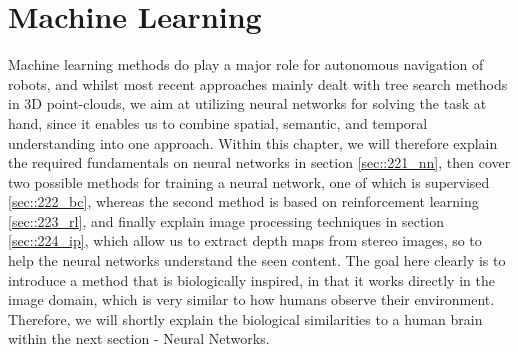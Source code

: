 \FloatBarrier
\section{Machine Learning}  
\label{sec::22_ml}
Machine learning methods do play a major role for autonomous navigation of robots, and whilst most recent approaches mainly dealt with tree search methods in 3D point-clouds, we aim at utilizing neural networks for solving the task at hand, since it enables us to combine spatial, semantic, and temporal understanding into one approach. Within this chapter, we will therefore explain the required fundamentals on neural networks in section \ref{sec::221_nn}, then cover two possible methods for training a neural network, one of which is supervised \ref{sec::222_bc}, whereas the second method is based on reinforcement learning \ref{sec::223_rl}, and finally explain image processing techniques in section \ref{sec::224_ip}, which allow us to extract depth maps from stereo images, so to help the neural networks understand the seen content. The goal here clearly is to introduce a method that is biologically inspired, in that it works directly in the image domain, which is very similar to how humans observe their environment. Therefore, we will shortly explain the biological similarities to a human brain within the next section - Neural Networks.